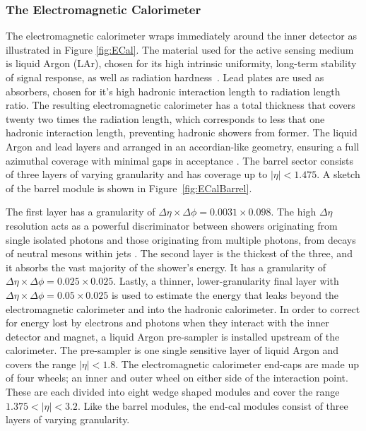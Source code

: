 \subsubsection{The Electromagnetic Calorimeter}
The electromagnetic calorimeter wraps immediately around the inner detector as illustrated in Figure \ref{fig:ECal}. The material used for the active sensing medium is liquid Argon (LAr), chosen for its high intrinsic uniformity, long-term stability of signal response, as well as radiation hardness~\cite{Zhang_2011}. Lead plates are used as absorbers, chosen for it's high hadronic interaction length to radiation length ratio. The resulting electromagnetic calorimeter has a total thickness that covers twenty two times the radiation length, which corresponds to less that one hadronic interaction length, preventing hadronic showers from former. The liquid Argon and lead layers and arranged in an accordian-like geometry, ensuring a full azimuthal coverage with minimal gaps in acceptance . The barrel sector consists of three layers of varying granularity and has coverage up to $|\eta| < 1.475$. A sketch of the barrel module is shown in Figure~\ref{fig:ECalBarrel}. 

The first layer has a granularity of $\Delta\eta\times\Delta\phi=0.0031\times 0.098$. The high $\Delta\eta$ resolution acts as a powerful discriminator between showers originating from single isolated photons and those originating from multiple photons, from decays of neutral mesons within jets . The second layer is the thickest of the three, and it absorbs the vast majority of the shower's energy. It has a granularity of $\Delta\eta\times\Delta\phi=0.025\times 0.025$. Lastly, a thinner, lower-granularity final layer with $\Delta\eta\times\Delta\phi=0.05\times 0.025$ is used to estimate the energy that leaks beyond the electromagnetic calorimeter and into the hadronic calorimeter. In order to correct for energy lost by electrons and photons when they interact with the inner detector and magnet, a liquid Argon pre-sampler is installed upstream of the calorimeter. The pre-sampler is one single sensitive layer of liquid Argon and covers the range $|\eta| < 1.8$. The electromagnetic calorimeter end-caps are made up of four wheels; an inner and outer wheel on either side of the interaction point. These are each divided into eight wedge shaped modules and cover the range $1.375 < |\eta| < 3.2$. Like the barrel modules, the end-cal modules consist of three layers of varying granularity.

